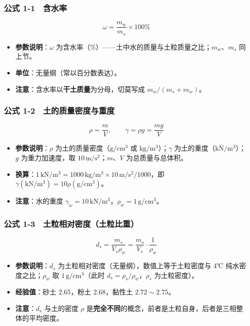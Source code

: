 \documentclass[
]{article}
\providecommand{\tightlist}{%
  \setlength{\itemsep}{0pt}\setlength{\parskip}{0pt}}
\begin{document}
\subsubsection{公式
1-1　含水率}\label{ux516cux5f0f-1-1-ux542bux6c34ux7387}

\[\omega=\frac{m_w}{m_s}\times100\%\]

\begin{itemize}
\tightlist
\item
  \textbf{参数说明}：\(\omega\)
  为含水率（\%）------土中水的质量与土粒质量之比；\(m_w\)、\(m_s\)
  同上节。
\item
  \textbf{单位}：无量纲（常以百分数表达）。
\item
  \textbf{注意}：含水率以\textbf{干土质量}为分母，切莫写成
  \(m_w/(m_s+m_w)\)。
\end{itemize}

\subsubsection{公式
1-2　土的质量密度与重度}\label{ux516cux5f0f-1-2-ux571fux7684ux8d28ux91cfux5bc6ux5ea6ux4e0eux91cdux5ea6}

\[\rho=\frac{m}{V},\qquad \gamma=\rho g=\frac{mg}{V}\]

\begin{itemize}
\tightlist
\item
  \textbf{参数说明}：\(\rho\) 为土的质量密度（\(\mathrm{g/cm^3}\) 或
  \(\mathrm{kg/m^3}\)）；\(\gamma\)
  为土的重度（\(\mathrm{kN/m^3}\)）；\(g\) 为重力加速度，取
  \(10\,\mathrm{m/s^2}\)；\(m\)、\(V\) 为总质量与总体积。
\item
  \textbf{换算}：\(1\,\mathrm{kN/m^3}=1000\,\mathrm{kg/m^3}\times10\,\mathrm{m/s^2}/1000\)，即
  \(\gamma(\mathrm{kN/m^3})=10\rho(\mathrm{g/cm^3})\)。
\item
  \textbf{注意}：水的重度
  \(\gamma_w=10\,\mathrm{kN/m^3}\)，\(\rho_w=1\,\mathrm{g/cm^3}\)。
\end{itemize}

\subsubsection{公式
1-3　土粒相对密度（土粒比重）}\label{ux516cux5f0f-1-3-ux571fux7c92ux76f8ux5bf9ux5bc6ux5ea6ux571fux7c92ux6bd4ux91cd}

\[d_s=\frac{m_s}{V_s\rho_w}=\frac{m_s}{V_s}\cdot\frac{1}{\rho_w}\]

\begin{itemize}
\tightlist
\item
  \textbf{参数说明}：\(d_s\)
  为土粒相对密度（无量纲），数值上等于土粒密度与 4℃
  纯水密度之比；\(\rho_w\) 取 \(1\,\mathrm{g/cm^3}\)（此时
  \(d_s=\rho_s/\rho_w\)，\(\rho_s\) 为土粒密度）。
\item
  \textbf{经验值}：砂土 \(2.65\)，粉土 \(2.68\)，黏性土
  \(2.72\sim2.75\)。
\item
  \textbf{注意}：\(d_s\) 与土的密度 \(\rho\)
  是\textbf{完全不同}的概念，前者是土粒自身，后者是三相整体的平均密度。
\end{itemize}
\end{document}
